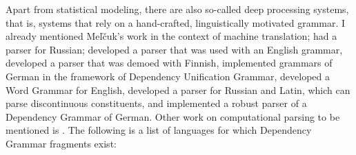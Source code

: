 Apart from statistical modeling, there are also so-called deep processing systems, that is, systems
that rely on a hand-crafted, linguistically motivated grammar. I already mentioned Meľčuk's work in
the context of machine translation; \citet{HZ60a-u} had a parser for Russian;
\citet{SN86a} developed a parser that was used with an English
grammar, \citet*{JLV86a-u} developed a parser that was demoed with Finnish, \citet{Hellwig86a-u,Hellwig2003a,Hellwig2006a}
implemented grammars of German in the framework of Dependency Unification Grammar, \citet{Hudson89a}
developed a Word Grammar for English,
\citet{Covington90a} developed a parser for Russian and Latin, which can parse discontinuous constituents, and
\citet{Menzel98a-u} implemented a robust parser of a Dependency Grammar of German.
Other work on computational parsing to be mentioned is
.
The following is a list of languages for which Dependency Grammar
fragments exist:

